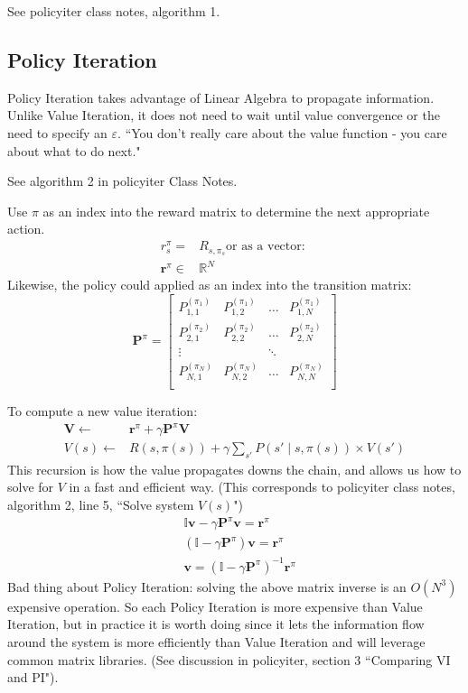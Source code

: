 \documentclass[11pt, oneside]{article}   	%
\begin{document}
See policyiter class notes, algorithm 1.

\subsection{Policy Iteration}

Policy Iteration takes advantage of Linear Algebra to propagate information. Unlike Value Iteration, it does not need to wait until value convergence or the need to specify an $\varepsilon$. ``You don't really care about the value function - you care about what to do next."

See algorithm 2 in policyiter Class Notes.

Use $\pi$ as an index into the reward matrix to determine the next appropriate action.
\begin{align}
r_s^\pi = & R_{s,\pi_s}  \text{or as a vector:  } \\
\mathbf{r}^\pi \in & \mathbb{R}^N
\end{align}
Likewise, the policy could applied as an index into the transition matrix:
\[
\mathbf{P}^\pi = \begin{bmatrix}
P_{1,1}^{(\pi_1)}  & P_{1,2}^{(\pi_1)} & \ldots & P_{1,N}^{(\pi_1)}\\[0.3em]
P_{2,1}^{(\pi_2)}  & P_{2,2}^{(\pi_2)} & \ldots & P_{2,N}^{(\pi_2)}\\[0.3em]
\vdots                   &                            & \ddots \\
P_{N,1}^{(\pi_N)}  & P_{N,2}^{(\pi_N)} & \ldots & P_{N,N}^{(\pi_N)}\\[0.3em]
\end{bmatrix}
\]

To compute a new value iteration:
\begin{align}
\mathbf{V} \leftarrow & \mathbf{r}^\pi + \gamma \mathbf{P}^\pi \mathbf{V}\\
V(s) \leftarrow  & R(s,\pi(s)) + \gamma \sum_{s'} P(s' \mid s, \pi(s)) \times V(s')
\end{align}
This recursion is how the value propagates downs the chain, and allows us how to solve for $V$ in a fast and efficient way.
(This corresponds to policyiter class notes, algorithm 2, line 5, ``Solve system $V(s)$")
\begin{align}
&\mathbb{I} \mathbf{v} - \gamma \mathbf{P}^\pi\mathbf{v} = \mathbf{r}^\pi \\
&(\mathbb{I} - \gamma \mathbf{P}^\pi)\mathbf{v} = \mathbf{r}^\pi \\
&\mathbf{v} =  (\mathbb{I} - \gamma \mathbf{P}^\pi)^{-1}\mathbf{r}^\pi
\end{align}
Bad thing about Policy Iteration: solving the above matrix inverse is an $O(N^3)$ expensive operation. So each Policy Iteration is more expensive than Value Iteration, but in practice it is worth doing since it lets the information flow around the system is more efficiently than Value Iteration and will leverage common matrix libraries. (See discussion in policyiter, section 3 ``Comparing VI and PI").
\end{document}
